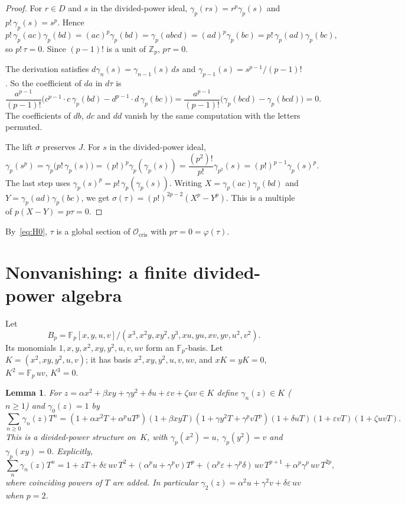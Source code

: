 \documentclass[11pt]{amsart}
\newtheorem{lemma}[theorem]{Lemma}
\theoremstyle{remark}
\newcommand{\Fp}{\mathbb{F}_p}
\newcommand{\Zp}{\mathbb{Z}_p}
\newcommand{\Ocris}{\mathcal{O}_{\mathrm{cris}}}
\begin{document}
\begin{proof}
For $r\in D$ and $s$ in the divided-power ideal, $\gamma_p(rs)=r^p\gamma_p(s)$ and $p!\,\gamma_p(s)=s^p$. Hence
\[
p!\,\gamma_p(ac)\gamma_p(bd)=(ac)^p\gamma_p(bd)=\gamma_p(abcd)=(ad)^p\gamma_p(bc)=p!\,\gamma_p(ad)\gamma_p(bc),
\]
so $p!\,\tau=0$. Since $(p-1)!$ is a unit of $\Zp$, $p\tau=0$.

The derivation satisfies $d\gamma_n(s)=\gamma_{n-1}(s)\,ds$ and $\gamma_{p-1}(s)=s^{p-1}/(p-1)!$. So the coefficient
of $da$ in $d\tau$ is
\[
\frac{a^{p-1}}{(p-1)!}\bigl(c^{p-1}\cdot c\,\gamma_p(bd)-d^{p-1}\cdot d\,\gamma_p(bc)\bigr)
=\frac{a^{p-1}}{(p-1)!}\bigl(\gamma_p(bcd)-\gamma_p(bcd)\bigr)=0.
\]
The coefficients of $db$, $dc$ and $dd$ vanish by the same computation with the letters permuted.

The lift $\sigma$ preserves $J$. For $s$ in the divided-power ideal,
\[
\gamma_p(s^p)=\gamma_p\bigl(p!\,\gamma_p(s)\bigr)=(p!)^p\gamma_p(\gamma_p(s))
=\frac{(p^2)!}{p!}\gamma_{p^2}(s)=(p!)^{p-1}\gamma_p(s)^p.
\]
The last step uses $\gamma_p(s)^p=p!\,\gamma_p(\gamma_p(s))$. Writing $X=\gamma_p(ac)\gamma_p(bd)$ and
$Y=\gamma_p(ad)\gamma_p(bc)$, we get $\sigma(\tau)=(p!)^{2p-2}(X^p-Y^p)$. This is a multiple of $p(X-Y)=p\tau=0$.
\end{proof}

By~\eqref{eq:H0}, $\tau$ is a global section of $\Ocris$ with $p\tau=0=\varphi(\tau)$.

\section{Nonvanishing: a finite divided-power algebra}

Let
\[
B_p=\Fp[x,y,u,v]/(x^3,x^2y,xy^2,y^3,xu,yu,xv,yv,u^2,v^2).
\]
Its monomials $1,x,y,x^2,xy,y^2,u,v,uv$ form an
$\Fp$-basis. Let $K=(x^2,xy,y^2,u,v)$; it has basis $x^2,xy,y^2,u,v,uv$, and $xK=yK=0$, $K^2=\Fp\,uv$, $K^3=0$.

\begin{lemma}\label{lem:detector}
For $z=\alpha x^2+\beta xy+\gamma y^2+\delta u+\varepsilon v+\zeta uv\in K$ define $\gamma_n(z)\in K$ ($n\geq1$) and
$\gamma_0(z)=1$ by
\[
\sum_{n\ge0}\gamma_n(z)T^n=(1+\alpha x^2T+\alpha^puT^p)(1+\beta xyT)(1+\gamma y^2T+\gamma^pvT^p)
(1+\delta uT)(1+\varepsilon vT)(1+\zeta uvT).
\]
This is a divided-power structure on~$K$, with $\gamma_p(x^2)=u$, $\gamma_p(y^2)=v$ and $\gamma_p(xy)=0$. Explicitly,
\[
\sum_n\gamma_n(z)T^n=1+zT+\delta\varepsilon\,uv\,T^2+(\alpha^pu+\gamma^pv)T^p
+(\alpha^p\varepsilon+\gamma^p\delta)\,uv\,T^{p+1}+\alpha^p\gamma^p\,uv\,T^{2p},
\]
where coinciding powers of $T$ are added. In particular $\gamma_2(z)=\alpha^2u+\gamma^2v+\delta\varepsilon\,uv$ when $p=2$.
\end{lemma}
\end{document}
